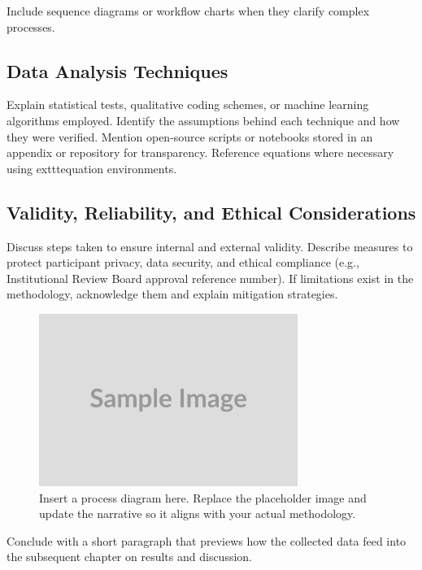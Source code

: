 Include sequence diagrams or workflow charts when they clarify complex
processes.

\subsection{Data Analysis Techniques}
Explain statistical tests, qualitative coding schemes, or machine learning
algorithms employed. Identify the assumptions behind each technique and how
they were verified. Mention open-source scripts or notebooks stored in an
appendix or repository for transparency. Reference equations where necessary
using exttt{equation} environments.

\subsection{Validity, Reliability, and Ethical Considerations}
Discuss steps taken to ensure internal and external validity. Describe measures
to protect participant privacy, data security, and ethical compliance (e.g.,
Institutional Review Board approval reference number). If limitations exist in
the methodology, acknowledge them and explain mitigation strategies.

\begin{figure}[H]
    \centering
    \includegraphics[width=0.75\textwidth]{figures/Figure.png}
    \caption{Insert a process diagram here. Replace the placeholder image and update the narrative so it aligns
        with your actual methodology.}\label{fig:workflow}
\end{figure}

\noindent Conclude with a short paragraph that previews how the collected data
feed into the subsequent chapter on results and discussion.
